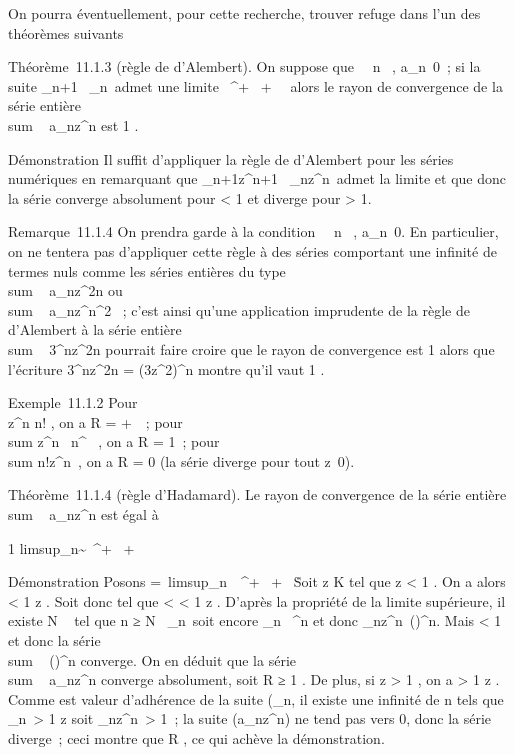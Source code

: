 \documentclass[]{article}
\begin{document}
On pourra éventuellement, pour cette recherche, trouver refuge dans l'un
des théorèmes suivants

Théorème~11.1.3 (règle de d'Alembert). On suppose que
\forall~~n \in {}~,
a_n\neq~0~; si la suite 
\a_n+1\
\over
\a_n\ admet
une limite \ell \in {}~^+ \cup\ + \infty~\,
alors le rayon de convergence de la série entière
\\sum ~
a_nz^n est  1 \over \ell .

Démonstration Il suffit d'appliquer la règle de d'Alembert pour les
séries numériques en remarquant que 
\a_n+1z^n+1\
\over
\a_nz^n\
admet la limite \ellz et que donc la série converge
absolument pour \ellz \textless{} 1 et diverge pour
\ellz \textgreater{} 1.

Remarque~11.1.4 On prendra garde à la condition
\forall~~n \in {}~,
a_n\neq~0. En particulier, on ne tentera
pas d'appliquer cette règle à des séries comportant une infinité de
termes nuls comme les séries entières du type
\\sum ~
a_nz^2n ou
\\sum ~
a_nz^n^2 ~; c'est ainsi qu'une
application imprudente de la règle de d'Alembert à la série entière
\\sum ~
3^nz^2n pourrait faire croire que le rayon de
convergence est  1 \over 3 alors que l'écriture
3^nz^2n =
\left
(3z^2\right )^n
montre qu'il vaut  1 \over {}
.

Exemple~11.1.2 Pour \\\sum
  z^n \over n! , on a R = +\infty~~; pour
\\sum   z^n~
\over n^\alpha~ , on a R = 1~; pour
\\sum  n!z^n~,
on a R = 0 (la série diverge pour tout z\neq~0).

Théorème~11.1.4 (règle d'Hadamard). Le rayon de convergence de la série
entière \\sum ~
a_nz^n est égal à

 1 \over
limsup\rootn\of\a_n\~
\in {}~^+ \cup\ + \infty~\

Démonstration Posons \ell =\
limsup\rootn\of\a_n\
\in {}~^+ \cup\ + \infty~\. Soit z \in K
tel que z \textless{} 1 \over \ell .
On a alors \ell \textless{} 1 \over
z . Soit donc \rho tel que \ell \textless{} \rho
\textless{} 1 \over z . D'après
la propriété de la limite supérieure, il existe N \in {}~ tel que n ≥ N
\rigtharrow~\rootn\of\a_n\
\leq \rho soit encore
\a_n\ \leq
\rho^n et donc
\a_nz^n\
\leq (\rhoz)^n. Mais \rhoz
\textless{} 1 et donc la série
\\sum ~
(\rhoz)^n converge. On en déduit que la
série \\sum ~
a_nz^n converge absolument, soit R ≥ 1
\over \ell . De plus, si z
\textgreater{} 1 \over \ell , on a \ell \textgreater{} 1
\over z . Comme \ell est valeur
d'adhérence de la suite
(\rootn\of\a_n\),
il existe une infinité de n tels que
\rootn\of\a_n\
\textgreater{} 1 \over z soit
\a_nz^n\
\textgreater{} 1~; la suite (a_nz^n) ne tend pas
vers 0, donc la série diverge~; ceci montre que R \leq 1
\over \ell , ce qui achève la démonstration.
\end{document}
